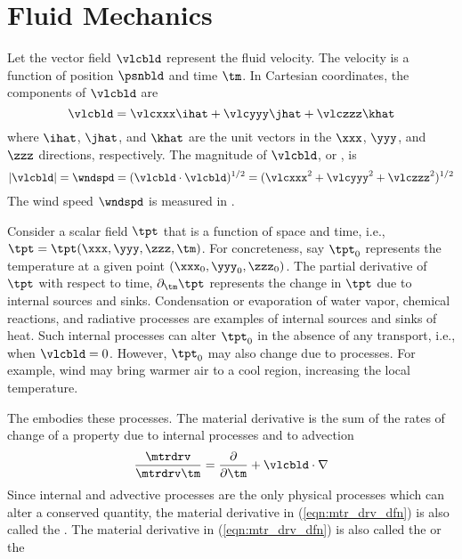 \documentclass[12pt,twoside]{book}
\newcounter{reaction} %
\begin{document}
\section{Fluid Mechanics}\label{sxn:fld_mch}
Let the vector field $\vlcbld$ represent the fluid velocity.
The velocity is a function of position $\psnbld$ and time $\tm$. 
In Cartesian coordinates, the components of $\vlcbld$ are 
\begin{equation}
\vlcbld = \vlcxxx \ihat + \vlcyyy \jhat + \vlczzz \khat
\label{eqn:vlc_dfn}
\end{equation}
where $\ihat$, $\jhat$, and $\khat$ are the unit vectors in the
$\xxx$, $\yyy$, and $\zzz$ directions, respectively.
The magnitude of $\vlcbld$, or , is
\begin{equation}
|\vlcbld| = \wndspd = (\vlcbld \cdot \vlcbld)^{1/2} = 
(\vlcxxx^{2} + \vlcyyy^{2} + \vlczzz^{2})^{1/2}
\label{eqn:spd_dfn}
\end{equation}
The wind speed $\wndspd$ is measured in \mxs.

Consider a scalar field $\tpt$ that is a function of space and time,
i.e., $\tpt = \tpt(\xxx,\yyy,\zzz,\tm)$.
For concreteness, say $\tpt_{0}$ represents the temperature at a given 
point $(\xxx_{0},\yyy_{0},\zzz_{0})$. 
The partial derivative of $\tpt$ with respect to time, $\partial_{\tm}
\tpt$ represents the change in $\tpt$ due to internal sources and
sinks. 
Condensation or evaporation of water vapor, chemical reactions, and
radiative processes are examples of internal sources and sinks of heat.  
Such internal processes can alter $\tpt_{0}$ in the absence of any
transport, i.e., when $\vlcbld = 0$.
However, $\tpt_{0}$ may also change due to  processes.   
For example, wind may bring warmer air to a cool region, increasing
the local temperature.

The  embodies these processes.
The material derivative is the sum of the rates of change of a
property due to internal processes and to advection
\begin{equation}
\frac{\mtrdrv}{\mtrdrv \tm} = 
\frac{\partial}{\partial \tm} + \vlcbld \cdot \nabla
\label{eqn:mtr_drv_dfn}
\end{equation}
Since internal and advective processes are the only physical processes
which can alter a conserved quantity, the material derivative in
(\ref{eqn:mtr_drv_dfn}) is also called the .
The material derivative in (\ref{eqn:mtr_drv_dfn}) is also called the
 or the 
\end{document}
